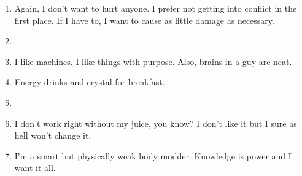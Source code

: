 \begin{enumerate}
	\item Again, I don't want to hurt anyone. I prefer not getting into conflict in the first place. If I have to, I want to cause as little damage as necessary.
	\item %
	\item I like machines. I like things with purpose. Also, brains in a guy are neat.
	\item Energy drinks and crystal for breakfast.
	\item %
	\item I don't work right without my juice, you know? I don't like it but I sure as hell won't change it.
	\item I'm a smart but physically weak body modder. Knowledge is power and I want it all.
\end{enumerate}

